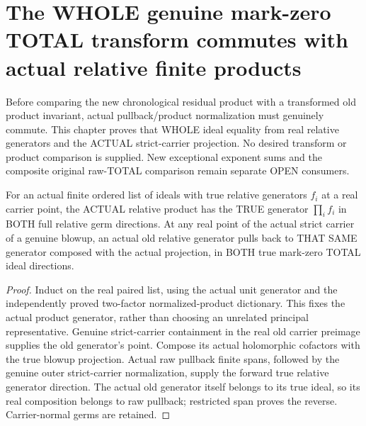\section{The WHOLE genuine mark-zero TOTAL transform commutes with actual relative finite products}

Before comparing the new chronological residual product with a transformed
old product invariant, actual pullback/product normalization must genuinely
commute. This chapter proves that WHOLE ideal equality from real relative
generators and the ACTUAL strict-carrier projection. No desired transform
or product comparison is supplied. New exceptional exponent sums and the
composite original raw-TOTAL comparison remain separate OPEN consumers.

\begin{lemma}
\label{hir:sharp-actual-relative-finite-product-determined-generator-total}
\leanok
For an actual finite ordered list of ideals with true relative generators
$f_i$ at a real carrier point, the ACTUAL relative product has the TRUE
generator $\prod_i f_i$ in BOTH full relative germ directions. At any real
point of the actual strict carrier of a genuine blowup, an actual old
relative generator pulls back to THAT SAME generator composed with the
actual projection, in BOTH true mark-zero TOTAL ideal directions.
\end{lemma}
\begin{proof}
Induct on the real paired list, using the actual unit generator and the
independently proved two-factor normalized-product dictionary. This fixes
the actual product generator, rather than choosing an unrelated principal
representative. Genuine strict-carrier containment in the real old carrier
preimage supplies the old generator's point. Compose its actual holomorphic
cofactors with the true blowup projection. Actual raw pullback finite spans,
followed by the genuine outer strict-carrier normalization, supply the
forward true relative generator direction. The actual old generator itself
belongs to its true ideal, so its real composition belongs to raw pullback;
restricted span proves the reverse. Carrier-normal germs are retained.
\end{proof}

